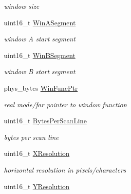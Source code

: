 \begin{DoxyCompactItemize}
\begin{DoxyCompactList}\small\item\em window size \end{DoxyCompactList}\item 
\hypertarget{group__vbe_ga99b747099fd4d4271b0f0bc29f31c48f}{}uint16\+\_\+t \hyperlink{group__vbe_ga99b747099fd4d4271b0f0bc29f31c48f}{Win\+A\+Segment}\label{group__vbe_ga99b747099fd4d4271b0f0bc29f31c48f}

\begin{DoxyCompactList}\small\item\em window A start segment \end{DoxyCompactList}\item 
\hypertarget{group__vbe_ga9edf422a931df7c7a1d5f82afb911566}{}uint16\+\_\+t \hyperlink{group__vbe_ga9edf422a931df7c7a1d5f82afb911566}{Win\+B\+Segment}\label{group__vbe_ga9edf422a931df7c7a1d5f82afb911566}

\begin{DoxyCompactList}\small\item\em window B start segment \end{DoxyCompactList}\item 
\hypertarget{group__vbe_gaffd250a4766543099f253e27af3abc35}{}phys\+\_\+bytes \hyperlink{group__vbe_gaffd250a4766543099f253e27af3abc35}{Win\+Func\+Ptr}\label{group__vbe_gaffd250a4766543099f253e27af3abc35}

\begin{DoxyCompactList}\small\item\em real mode/far pointer to window function \end{DoxyCompactList}\item 
\hypertarget{group__vbe_gafe40654a51bf4a12a8b376ff3506688e}{}uint16\+\_\+t \hyperlink{group__vbe_gafe40654a51bf4a12a8b376ff3506688e}{Bytes\+Per\+Scan\+Line}\label{group__vbe_gafe40654a51bf4a12a8b376ff3506688e}

\begin{DoxyCompactList}\small\item\em bytes per scan line \end{DoxyCompactList}\item 
\hypertarget{group__vbe_ga16f6408e5a85c7a7785a0cee64b6a219}{}uint16\+\_\+t \hyperlink{group__vbe_ga16f6408e5a85c7a7785a0cee64b6a219}{X\+Resolution}\label{group__vbe_ga16f6408e5a85c7a7785a0cee64b6a219}

\begin{DoxyCompactList}\small\item\em horizontal resolution in pixels/characters \end{DoxyCompactList}\item 
\hypertarget{group__vbe_gafa8aba2156994750d500f85d0f8425cb}{}uint16\+\_\+t \hyperlink{group__vbe_gafa8aba2156994750d500f85d0f8425cb}{Y\+Resolution}\label{group__vbe_gafa8aba2156994750d500f85d0f8425cb}


\end{DoxyCompactItemize}
